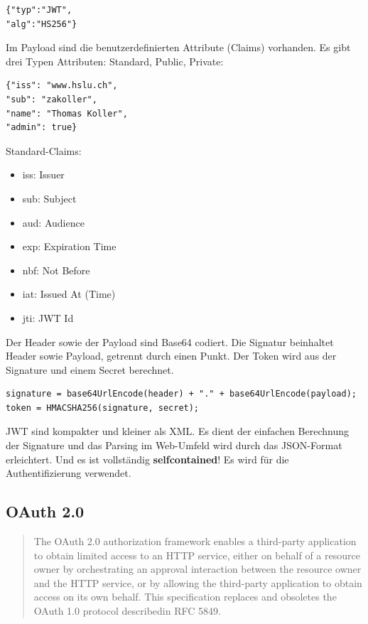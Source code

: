 \begin{lstlisting}[caption=JWT Header]
{"typ":"JWT",
"alg":"HS256"}
\end{lstlisting}

Im Payload sind die benutzerdefinierten Attribute (Claims) vorhanden. Es gibt drei Typen Attributen: Standard, Public, Private:

\begin{lstlisting}[caption=JWT Payload]
{"iss": "www.hslu.ch",
"sub": "zakoller",
"name": "Thomas Koller",
"admin": true}
\end{lstlisting}

Standard-Claims:
\begin{itemize}
	\item iss: Issuer
	\item sub: Subject
	\item aud: Audience
	\item exp: Expiration Time
	\item nbf: Not Before
	\item iat: Issued At (Time)
	\item jti: JWT Id
\end{itemize}

Der Header sowie der Payload sind Base64 codiert. Die Signatur beinhaltet Header sowie Payload, getrennt durch einen Punkt. Der Token wird aus der Signature und einem Secret berechnet.

\begin{lstlisting}[caption=JWT Signature]
signature = base64UrlEncode(header) + "." + base64UrlEncode(payload);
token = HMACSHA256(signature, secret);
\end{lstlisting}

JWT sind kompakter und kleiner als XML. Es dient der einfachen Berechnung der Signature und das Parsing im Web-Umfeld wird durch das JSON-Format erleichtert. Und es ist vollständig \textbf{selfcontained}! Es wird für die Authentifizierung verwendet.

\subsection{OAuth 2.0}

\begin{quote}
The OAuth 2.0 authorization framework enables a third-party
application to obtain limited access to an HTTP service, either on
behalf of a resource owner by orchestrating an approval interaction
between the resource owner and the HTTP service, or by allowing
the third-party application to obtain access on its own behalf. This
specification replaces and obsoletes the OAuth 1.0 protocol
describedin RFC 5849.
\end{quote}


